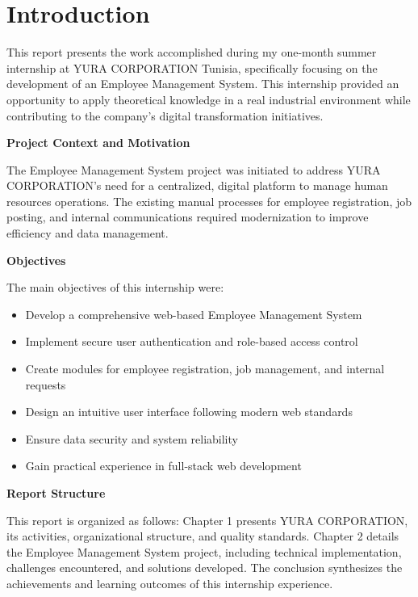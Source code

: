 \chapter*{Introduction}
\label{chap:introduction}

\noindent This report presents the work accomplished during my one-month summer internship at YURA CORPORATION Tunisia, specifically focusing on the development of an Employee Management System. This internship provided an opportunity to apply theoretical knowledge in a real industrial environment while contributing to the company's digital transformation initiatives.

\vspace{0.5cm}

\noindent \textbf{Project Context and Motivation}

The Employee Management System project was initiated to address YURA CORPORATION's need for a centralized, digital platform to manage human resources operations. The existing manual processes for employee registration, job posting, and internal communications required modernization to improve efficiency and data management.

\vspace{0.5cm}

\noindent \textbf{Objectives}

The main objectives of this internship were:
\begin{itemize}
    \item Develop a comprehensive web-based Employee Management System
    \item Implement secure user authentication and role-based access control
    \item Create modules for employee registration, job management, and internal requests
    \item Design an intuitive user interface following modern web standards
    \item Ensure data security and system reliability
    \item Gain practical experience in full-stack web development
\end{itemize}

\vspace{0.5cm}

\noindent \textbf{Report Structure}

This report is organized as follows: Chapter 1 presents YURA CORPORATION, its activities, organizational structure, and quality standards. Chapter 2 details the Employee Management System project, including technical implementation, challenges encountered, and solutions developed. The conclusion synthesizes the achievements and learning outcomes of this internship experience.

